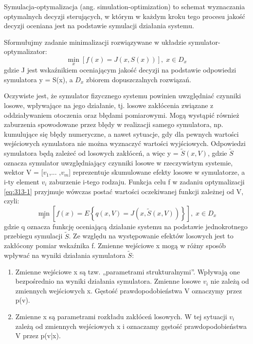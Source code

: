 Symulacja-optymalizacja (ang. simulation-optimization) to schemat
wyznaczania optymalnych decyzji sterujących, w którym w każdym kroku tego procesu jakość decyzji oceniana jest na podstawie symulacji działania systemu.

Sformułujmy zadanie minimalizacji rozwiązywane w układzie symulator-optymalizator:
\begin{equation}
    \label{eq:313-1}
    \min_x [f(x) = J(x,S(x))],\;x\in D_x
\end{equation}
gdzie J jest wskaźnikiem oceniającym jakość decyzji na podstawie odpowiedzi
symulatora y = S(x), a $D_x$ zbiorem dopuszczalnych rozwiązań.

Oczywiste jest, że symulator fizycznego systemu powinien uwzględniać
czynniki losowe, wpływające na jego działanie, tj. losowe zakłócenia związane z oddziaływaniem otoczenia oraz błędami pomiarowymi. Mogą wystąpić również zaburzenia spowodowane przez błędy w realizacji samego symulatora, np. kumulujące się błędy numeryczne, a nawet sytuacje, gdy dla pewnych wartości wejściowych symulatora nie można wyznaczyć wartości wyjściowych. Odpowiedzi symulatora będą zależeć od losowych zakłóceń, a więc y = $\tilde{S}(x,V)$, gdzie $\tilde{S}$ oznacza symulator uwzględniający czynniki losowe w rzeczywistym systemie, wektor V = [$v_1$,... ,$v_m$] reprezentuje skumulowane efekty losowe w symulatorze, a i-ty element $v_i$ zaburzenie i-tego rodzaju. Funkcja celu f w zadaniu optymalizacji \eqref{eq:313-1} przyjmuje wówczas postać wartości oczekiwanej
funkcji zależnej od V, czyli:
\begin{equation}
    \label{eq:313-2}
    \min_x \left[f(x) = E\left\{ q(x,V) = J(x,\tilde{S}(x,V))\right\}\right],\;x\in D_x
\end{equation}
gdzie q oznacza funkcję oceniającą działanie systemu na podstawie jednokrotnego przebiegu symulacji $\tilde{S}$. Ze względu na występowanie efektów losowych jest to zakłócony pomiar wskaźnika f. Zmienne wejściowe x mogą w różny sposób wpływać na wyniki działania symulatora $\tilde{S}$:
\begin{enumerate}
    \item Zmienne wejściowe x są tzw. „parametrami strukturalnymi”. Wpływają one bezpośrednio na wyniki działania symulatora. Zmienne losowe $v_i$ nie zależą od zmiennych wejściowych x. Gęstość prawdopodobieństwa V oznaczymy przez p(v).
    \item Zmienne x są parametrami rozkładu zakłóceń losowych. W tej sytuacji $v_i$ zależą od zmiennych wejściowych x i oznaczamy gęstość prawdopodobieństwa V przez p(v|x).
\end{enumerate}

